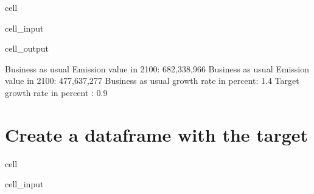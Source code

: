 \documentclass[letterpaper,10pt,english]{jupyterBook}
\begin{document}
\begin{sphinxuseclass}{cell}
\begin{sphinxVerbatimInput}
\begin{sphinxuseclass}{cell_input}
\end{sphinxuseclass}\end{sphinxVerbatimInput}
\begin{sphinxVerbatimOutput}

\begin{sphinxuseclass}{cell_output}
\begin{sphinxVerbatim}[commandchars=\\\{\}]
Business as usual Emission value in 2100:   682,338,966
Business as usual Emission value in 2100:   477,637,277
Business as usual growth rate in percent:          1.4\PYGZpc{}
Target growth rate in percent           :          0.9\PYGZpc{}
\end{sphinxVerbatim}

\end{sphinxuseclass}\end{sphinxVerbatimOutput}

\end{sphinxuseclass}

\section{Create a dataframe with the target}
\label{\detokenize{content/howto/targetinstruments/One target one instrument with 3 instrument variables:create-a-dataframe-with-the-target}}
\begin{sphinxuseclass}{cell}\begin{sphinxVerbatimInput}

\begin{sphinxuseclass}{cell_input}
\begin{sphinxVerbatim}[commandchars=\\\{\}]
  \PYG{p}{[}\PYG{p}{[}\PYG{p}{]}\PYG{p}{]}     
   
\end{sphinxVerbatim}

\end{sphinxuseclass}\end{sphinxVerbatimInput}

\end{sphinxuseclass}
\end{document}
